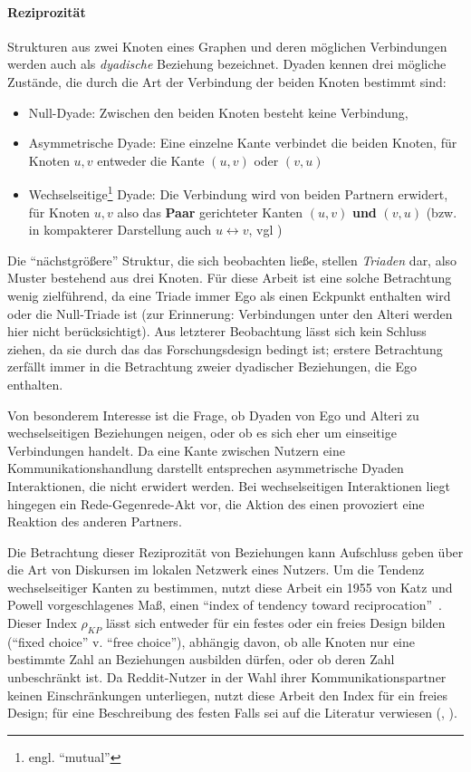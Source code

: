 \documentclass[11pt,a4paper,twoside]{article}
\providecommand{\tightlist}{%
  \setlength{\itemsep}{0pt}\setlength{\parskip}{0pt}}
\let\rmarkdownfootnote\footnote%
\def\footnote{\protect\rmarkdownfootnote}
\let\oldpar\paragraph
\renewcommand{\paragraph}{\oldpar*}
\begin{document}
\hypertarget{reziprozitat}{%
\paragraph{Reziprozität}\label{reziprozitat}}

Strukturen aus zwei Knoten eines Graphen und deren möglichen
Verbindungen werden auch als \emph{dyadische} Beziehung bezeichnet.
Dyaden kennen drei mögliche Zustände, die durch die Art der Verbindung
der beiden Knoten bestimmt sind:

\begin{itemize}
\tightlist
\item
  Null-Dyade: Zwischen den beiden Knoten besteht keine Verbindung,
\item
  Asymmetrische Dyade: Eine einzelne Kante verbindet die beiden Knoten,
  für Knoten \(u,v\) entweder die Kante \((u,v)\) oder \((v,u)\)
\item
  Wechselseitige\footnote{engl. \enquote{mutual}} Dyade: Die Verbindung
  wird von beiden Partnern erwidert, für Knoten \(u,v\) also das
  \textbf{Paar} gerichteter Kanten \((u,v)\) \textbf{und} \((v,u)\)
  (bzw. in kompakterer Darstellung auch \(u \leftrightarrow v\), vgl
  \autocite[S. 510]{Wasserman1994})
\end{itemize}

Die \enquote{nächstgrößere} Struktur, die sich beobachten ließe, stellen
\emph{Triaden} dar, also Muster bestehend aus drei Knoten. Für diese
Arbeit ist eine solche Betrachtung wenig zielführend, da eine Triade
immer Ego als einen Eckpunkt enthalten wird oder die Null-Triade ist
(zur Erinnerung: Verbindungen unter den Alteri werden hier nicht
berücksichtigt). Aus letzterer Beobachtung lässt sich kein Schluss
ziehen, da sie durch das das Forschungsdesign bedingt ist; erstere
Betrachtung zerfällt immer in die Betrachtung zweier dyadischer
Beziehungen, die Ego enthalten.

Von besonderem Interesse ist die Frage, ob Dyaden von Ego und Alteri zu
wechselseitigen Beziehungen neigen, oder ob es sich eher um einseitige
Verbindungen handelt. Da eine Kante zwischen Nutzern eine
Kommunikationshandlung darstellt entsprechen asymmetrische Dyaden
Interaktionen, die nicht erwidert werden. Bei wechselseitigen
Interaktionen liegt hingegen ein Rede-Gegenrede-Akt vor, die Aktion des
einen provoziert eine Reaktion des anderen Partners.

Die Betrachtung dieser Reziprozität von Beziehungen kann Aufschluss
geben über die Art von Diskursen im lokalen Netzwerk eines Nutzers. Um
die Tendenz wechselseitiger Kanten zu bestimmen, nutzt diese Arbeit ein
1955 von Katz und Powell vorgeschlagenes Maß, einen \enquote{index of
tendency toward reciprocation}~\autocite{Katz1955}. Dieser Index
\(\rho_{KP}\) lässt sich entweder für ein festes oder ein freies Design
bilden (\enquote{fixed choice} v. \enquote{free choice}), abhängig
davon, ob alle Knoten nur eine bestimmte Zahl an Beziehungen ausbilden
dürfen, oder ob deren Zahl unbeschränkt ist. Da Reddit-Nutzer in der
Wahl ihrer Kommunikationspartner keinen Einschränkungen unterliegen,
nutzt diese Arbeit den Index für ein freies Design; für eine
Beschreibung des festen Falls sei auf die Literatur verwiesen
(\autocite{Katz1955}, \autocite{Wasserman1994}).
\end{document}
